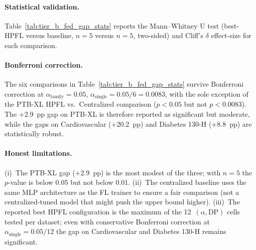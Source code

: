 \documentclass[conference]{IEEEtran}
\begin{document}
\paragraph{Statistical validation.} Table~\ref{tab:tier_b_fed_gap_stats} reports the Mann--Whitney U test (best-HPFL versus baseline, $n{=}5$ versus $n{=}5$, two-sided) and Cliff's $\delta$ effect-size for each comparison.

\begin{table}[htbp]
\centering
\caption{Mann--Whitney U test and Cliff's $\delta$ for the federation gap comparisons of Table~\ref{tab:tier_b_fed_gap}. $n{=}5$ best-HPFL seeds vs.\ $n{=}5$ baseline seeds per dataset.}
\label{tab:tier_b_fed_gap_stats}
\small
{}
\end{table}

\paragraph{Bonferroni correction.} The six comparisons in Table~\ref{tab:tier_b_fed_gap_stats} survive Bonferroni correction at $\alpha_{\text{family}}{=}0.05$, $\alpha_{\text{single}}{=}0.05/6{=}0.0083$, with the sole exception of the PTB-XL HPFL vs.\ Centralized comparison ($p{<}0.05$ but not $p{<}0.0083$). The $+$2.9~pp gap on PTB-XL is therefore reported as significant but moderate, while the gaps on Cardiovascular ($+$20.2~pp) and Diabetes 130-H ($+$8.8~pp) are statistically robust.

\paragraph{Honest limitations.} (i)~The PTB-XL gap ($+$2.9~pp) is the most modest of the three; with $n{=}5$ the $p$-value is below 0.05 but not below 0.01. (ii)~The centralized baseline uses the same MLP architecture as the FL trainer to ensure a fair comparison (not a centralized-tuned model that might push the upper bound higher). (iii)~The reported best HPFL configuration is the maximum of the 12~$(\alpha,\text{DP})$ cells tested per dataset; even with conservative Bonferroni correction at $\alpha_{\text{single}}{=}0.05/12$ the gap on Cardiovascular and Diabetes 130-H remains significant.
\end{document}
